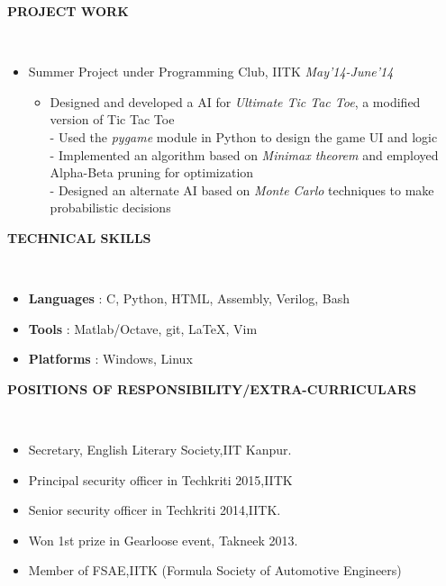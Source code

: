 \documentclass[a4paper,10pt]{article}
\newcommand{\isep}{-2 pt}
\newcommand{\lsep}{-0.5cm}
\newcommand{\resheading}[1]{{\small \colorbox{mygrey}{\begin{minipage}{0.975\textwidth}{\textbf{#1 \vphantom{p\^{E}}}}\end{minipage}}}}
\begin{document}
\resheading{\textbf{PROJECT WORK} }\\[\lsep]
\begin{itemize}
\item\noindent Summer Project under Programming Club, IITK \hfill\emph{May'14-June'14}
\vspace{-2mm}
\begin{itemize}\itemsep \isep
\item \noindent Designed and developed a AI for \emph{Ultimate Tic Tac Toe}, a modified version of Tic Tac Toe\\
- Used the \emph{pygame} module in Python to design the game UI and logic\\
- Implemented an algorithm based on \emph{Minimax theorem} and employed Alpha-Beta pruning for optimization\\
- Designed an alternate AI based on \emph{Monte Carlo} techniques to make probabilistic decisions\\
\end{itemize}
\end{itemize}

\resheading{\textbf{TECHNICAL SKILLS} }\\[\lsep]
\begin{itemize}\itemsep\isep
\item \noindent \textbf{Languages} : C, Python, HTML, Assembly, Verilog, Bash
\item \noindent \textbf{Tools} : Matlab/Octave, git, \LaTeX, Vim
\item \noindent \textbf{Platforms} : Windows, Linux
\end{itemize}

\resheading{\textbf{POSITIONS OF RESPONSIBILITY/EXTRA-CURRICULARS} }\\[\lsep]
\begin{itemize}\itemsep \isep
\item \noindent Secretary, English Literary Society,IIT Kanpur.
\item \noindent Principal security officer in Techkriti 2015,IITK
\item \noindent Senior security officer in Techkriti 2014,IITK.
\item \noindent Won 1st prize in Gearloose event, Takneek 2013.
\item \noindent Member of FSAE,IITK (Formula Society of Automotive Engineers)
\end{itemize}
\end{document}
